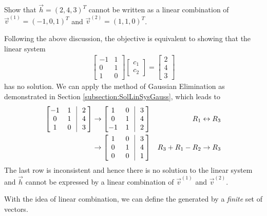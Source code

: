 \begin{exmp}
Show that $\vec{h} = (2,4,3)^T$ cannot be written as a linear combination of $\vec{v}^{(1)} = (-1, 0, 1)^T$ and $\vec{v}^{(2)} = (1, 1, 0)^T$.
\end{exmp}
\begin{solution}
Following the above discussion, the objective is equivalent to showing that the linear system
\begin{align*}
\begin{bmatrix}
-1 & 1 \\
0 & 1 \\
1 & 0
\end{bmatrix}
\begin{bmatrix}
c_1 \\
c_2
\end{bmatrix}
=
\begin{bmatrix}
2 \\
4 \\
3
\end{bmatrix}
\end{align*}
has no solution. We can apply the method of Gaussian Elimination as demonstrated in Section \ref{subsection:SolLinSysGauss}, which leads to
\begin{align*}
\left[\begin{array}{@{\,}wc{10pt}wc{10pt}|wc{10pt}@{}}
-1 & 1 & 2\\
0 & 1 & 4\\
1 & 0 & 3
\end{array}\right] 
&\to
\left[\begin{array}{@{\,}wc{10pt}wc{10pt}|wc{10pt}@{}}
1 & 0 & 3 \\
0 & 1 & 4 \\
-1 & 1 & 2
\end{array}\right] & R_1 \leftrightarrow R_3 \\
&\to
\left[\begin{array}{@{\,}wc{10pt}wc{10pt}|wc{10pt}@{}}
1 & 0 & 3 \\
0 & 1 & 4 \\
0 & 0 & 1
\end{array}\right] & R_3 + R_1 - R_2 \to R_3
\end{align*}
The last row is inconsistent and hence there is no solution to the linear system and $\vec{h}$ cannot be expressed by a linear combination of $\vec{v}^{(1)}$ and $\vec{v}^{(2)}$.
\end{solution}
With the idea of linear combination, we can define the  generated by a \textit{finite} set of vectors.
